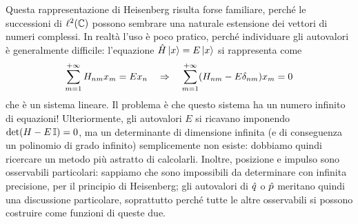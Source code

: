 Questa rappresentazione di Heisenberg risulta forse familiare, perch\'e le successioni di $\ell^2(\mathbb{C})$ possono sembrare una naturale estensione dei vettori di numeri complessi.
In realtà l'uso è poco pratico, perch\'e individuare gli autovalori è generalmente difficile: l'equazione $\hat{H}\left|{x}\right\rangle=E\left|{x}\right\rangle$ si rappresenta come
\begin{equation}
	\sum_{{m}=1}^{+\infty}H_{nm}x_m=Ex_n\quad\Rightarrow\quad\sum_{{m}=1}^{+\infty}(H_{nm}-E\delta_{nm})x_m=0
\end{equation}
che è un sistema lineare.
Il problema è che questo sistema ha un numero infinito di equazioni!
Ulteriormente, gli autovalori $E$ si ricavano imponendo $\det(H-E\operatorname{\mathbb{I}})=0$, ma un determinante di dimensione infinita (e di conseguenza un polinomio di grado infinito) semplicemente non esiste: dobbiamo quindi ricercare un metodo più astratto di calcolarli.
Inoltre, posizione e impulso sono osservabili particolari: sappiamo che sono impossibili da determinare con infinita precisione, per il principio di Heisenberg; gli autovalori di $\hat{q}$ o $\hat{p}$ meritano quindi una discussione particolare, soprattutto perch\'e tutte le altre osservabili si possono costruire come funzioni di queste due.

